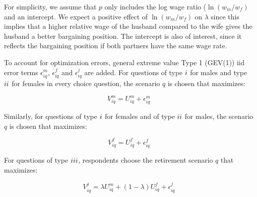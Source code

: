 \documentclass[11pt,letter]{article}
\begin{document}
For simplicity, we assume that $p$ only includes the log wage ratio ($\ln(w_m/w_f)$ and an intercept. We expect a positive effect of $\ln(w_m/w_f)$ on $\lambda$ since this implies that a higher relative wage of the husband compared to the wife gives the husband a better bargaining position. The intercept is also of interest, since it reflects the bargaining position if both partners have the same wage rate.

\par To account for optimization errors, general extreme value Type 1 (GEV(1)) iid error terms $\epsilon_{iq}^{m}$, $\epsilon_{iq}^{f}$ and $\epsilon_{iq}^{j}$ are added. For questions of type $\uppercase \expandafter {\romannumeral 1}$ for males and type  $\uppercase \expandafter {\romannumeral 2}$ for females in every choice question, the scenario $q$ is chosen that maximizes:

\begin{equation}
V_{iq}^{m}=U_{iq}^{m}+\epsilon_{iq}^{m}
\end{equation}

\par Similarly, for questions of type $\uppercase \expandafter {\romannumeral 1}$ for females and of type $\uppercase \expandafter {\romannumeral 2}$ for  males, the scenario $q$ is chosen that maximizes:

\begin{equation}
V_{iq}^{f}=U_{iq}^{f}+\epsilon_{iq}^{f}
\end{equation}

\par For questions of type $\uppercase \expandafter {\romannumeral 3}$, respondents choose the retirement scenario $q$ that maximizes:

\begin{equation}\label{totalut}
V_{iq}^{j}=\lambda U_{iq}^{m}  +(1-\lambda) U_{iq}^{f} +\epsilon_{iq}^{j}
\end{equation}
\end{document}
